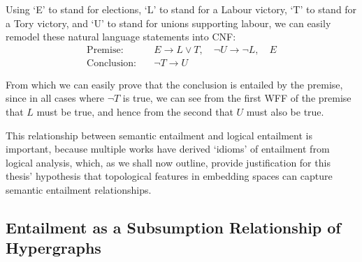 \documentclass[12pt,twoside]{report}
\begin{document}
Using `E' to stand for elections, `L' to stand for a Labour victory, `T' to stand for a Tory victory, and `U' to stand for unions supporting labour, we can easily remodel these natural language statements into CNF: 
\begin{align*}
\text{Premise:} \quad & E \rightarrow L \lor T, \quad \lnot U \rightarrow \lnot L, \quad E \\
\text{Conclusion:} \quad & \lnot T \rightarrow U
\end{align*}

From which we can easily prove that the conclusion is entailed by the premise, since in all cases where $\lnot T$ is true, we can see from the first WFF of the premise that $L$ must be true, and hence from the second that $U$ must also be true. \newline \par

This relationship between semantic entailment and logical entailment is important, because multiple works have derived `idioms' of entailment from logical analysis, which, as we shall now outline, provide justification for this thesis' hypothesis that topological features in embedding spaces can capture semantic entailment relationships. 

\subsection{Entailment as a Subsumption Relationship of Hypergraphs}
\end{document}
